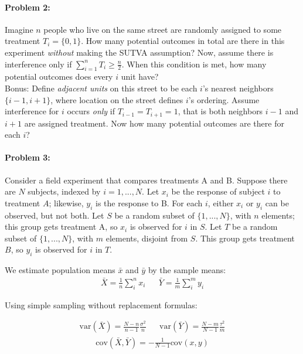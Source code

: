 \documentclass{article}
\begin{document}
\paragraph{Problem 2:}

Imagine $n$ people who live on the same street are randomly assigned
to some treatment $T_i=\{0,1\}$. How many potential outcomes in total
are there in this experiment {\em without} making the SUTVA
assumption?  Now, assume there is
interference only if $\sum_{i=1}^n T_i \geq \frac{n}{2}$. When this
condition is met, how many potential outcomes does every $i$
unit have? \\

Bonus: Define {\em adjacent units} on this street to be each $i$'s
nearest neighbors $\{i-1,i+1\}$, where location on the street defines
$i$'s ordering. Assume interference for $i$ occurs {\em only } if
$T_{i-1}=T_{i+1}=1$, that is both neighbors $i-1$ and $i+1$ are
assigned treatment. Now how many potential outcomes are there for each
$i$?


\paragraph{Problem 3:} Consider a field experiment that compares
treatments A and B. Suppose there are $N$ subjects, indexed by
$i=1,...,N$. Let $x_i$ be the response of subject $i$ to treatment
$A$; likewise, $y_i$ is the response to B. For each $i$, either $x_i$
or $y_i$ can be observed, but not both. Let $S$ be a random subset of
$\{1,...,N\}$, with $n$ elements; this group gets treatment A, so
$x_i$ is observed for $i$ in $S$. Let $T$ be a random subset of
$\{1,...,N\}$, with $m$ elements, disjoint from $S$. This group gets
treatment $B$, so $y_i$ is observed for $i$ in $T$.

We estimate population means $\bar x$ and $\bar y$ by the sample
means:
\begin{align*}
\bar X = \frac{1}{n} \sum_{i}^nx_i & &\bar Y = \frac{1}{m} \sum_{i}^my_i\end{align*}

Using simple sampling without replacement formulas:

\begin{align*}
\textrm{var}(\bar X) = \frac{N-n}{n-1}\frac{\sigma^2}{n}&
&\textrm{var}(\bar Y) = \frac{N-m}{N-1}\frac{\tau^2}{m}
\end{align*}
\begin{align*}
\textrm{cov}(\bar X, \bar Y)= -\frac{1}{N-1} \textrm{cov}(x,y)
\end{align*}
\end{document}
